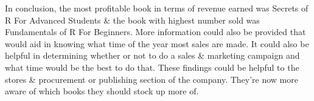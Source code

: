 \documentclass[
]{article}
\begin{document}
In conclusion, the most profitable book in terms of revenue earned was
Secrets of R For Advanced Students \& the book with highest number sold
was Fundamentals of R For Beginners. More information could also be
provided that would aid in knowing what time of the year most sales are
made. It could also be helpful in determining whether or not to do a
sales \& marketing campaign and what time would be the best to do that.
These findings could be helpful to the stores \& procurement or
publishing section of the company. They're now more aware of which books
they should stock up more of.
\end{document}
